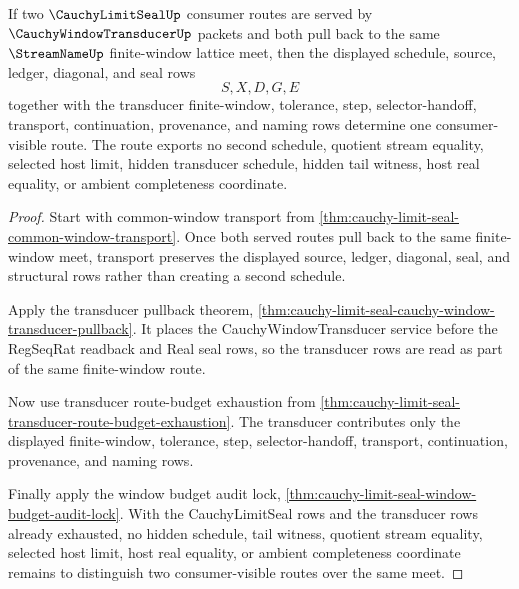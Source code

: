 \begin{theorem}
\label{thm:cauchy-limit-seal-transducer-meet-determinacy}
If two $\CauchyLimitSealUp$ consumer routes are served by $\CauchyWindowTransducerUp$ packets and both pull back to the same $\StreamNameUp$ finite-window lattice meet, then the displayed schedule, source, ledger, diagonal, and seal rows
$$
S,X,D,G,E
$$
together with the transducer finite-window, tolerance, step, selector-handoff, transport, continuation, provenance, and naming rows determine one consumer-visible route. The route exports no second schedule, quotient stream equality, selected host limit, hidden transducer schedule, hidden tail witness, host real equality, or ambient completeness coordinate.
\end{theorem}
\begin{proof}
Start with common-window transport from \autoref{thm:cauchy-limit-seal-common-window-transport}. Once both served routes pull back to the same finite-window meet, transport preserves the displayed source, ledger, diagonal, seal, and structural rows rather than creating a second schedule.

Apply the transducer pullback theorem, \autoref{thm:cauchy-limit-seal-cauchy-window-transducer-pullback}. It places the CauchyWindowTransducer service before the RegSeqRat readback and Real seal rows, so the transducer rows are read as part of the same finite-window route.

Now use transducer route-budget exhaustion from \autoref{thm:cauchy-limit-seal-transducer-route-budget-exhaustion}. The transducer contributes only the displayed finite-window, tolerance, step, selector-handoff, transport, continuation, provenance, and naming rows.

Finally apply the window budget audit lock, \autoref{thm:cauchy-limit-seal-window-budget-audit-lock}. With the CauchyLimitSeal rows and the transducer rows already exhausted, no hidden schedule, tail witness, quotient stream equality, selected host limit, host real equality, or ambient completeness coordinate remains to distinguish two consumer-visible routes over the same meet.
\end{proof}

